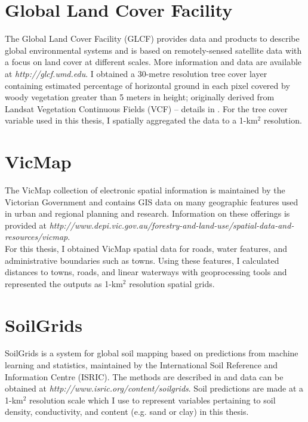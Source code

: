 \section{Global Land Cover Facility}

The Global Land Cover Facility (GLCF) provides data and products to describe global environmental systems and is based on remotely-sensed satellite data with a focus on land cover at different scales. More information and data are available at \textit{http://glcf.umd.edu}. I obtained a 30-metre resolution tree cover layer containing estimated percentage of horizontal ground in each pixel covered by woody vegetation greater than 5 meters in height; originally derived from Landsat Vegetation Continuous Fields (VCF) -- details in \cite{sext13}. For the tree cover variable used in this thesis, I spatially aggregated the data to a 1-km$^2$ resolution.

\section{VicMap}

The VicMap collection of electronic spatial information is maintained by the Victorian Government and contains GIS data on many geographic features used in urban and regional planning and research. Information on these offerings is provided at \textit{http://www.depi.vic.gov.au/forestry-and-land-use/spatial-data-and-resources/vicmap}.\\\noindent For this thesis, I obtained VicMap spatial data for roads, water features, and administrative boundaries such as towns. Using these features, I calculated distances to towns, roads, and linear waterways with geoprocessing tools and represented the outputs as 1-km$^2$ resolution spatial grids.

\section{SoilGrids}

SoilGrids is a system for global soil mapping based on predictions from machine learning and statistics, maintained by the International Soil Reference and Information Centre (ISRIC). The methods are described in \cite{heng14} and data can be obtained at \textit{http://www.isric.org/content/soilgrids}. Soil predictions are made at a 1-km$^2$ resolution scale which I use to represent variables pertaining to soil density, conductivity, and content (e.g. sand or clay) in this thesis.

